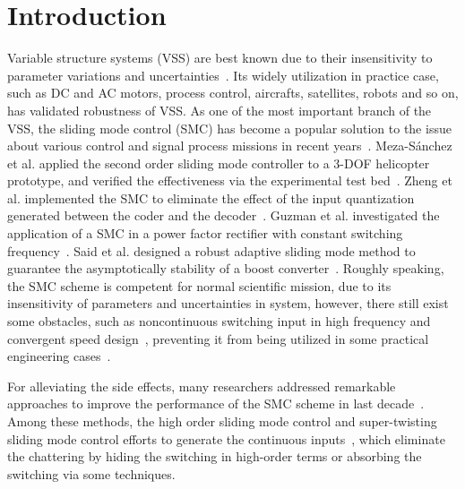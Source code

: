 \documentclass[3p]{elsarticle}
\theoremstyle{plain}
\theoremstyle{remark}
\begin{document}
\section{Introduction}
Variable structure systems (VSS) are best known due to their insensitivity to parameter variations and uncertainties~\cite{slotine1991applied}. Its widely utilization in practice case, such as DC and AC motors, process control, aircrafts, satellites, robots and so on, has validated robustness of VSS. As one of the most important branch of the VSS, the sliding mode control (SMC) has become a popular solution to the issue about various control and signal process missions in recent years~\cite{zhao2015nonlinear,zhang2015attitude}. Meza-S{\'a}nchez et al. applied the second order sliding mode controller to a 3-DOF helicopter prototype, and verified the effectiveness via the experimental test bed~\cite{meza2015output}. Zheng et al. implemented the SMC to eliminate the effect of the input quantization generated between the coder and the decoder~\cite{zheng2016sliding}. Guzman et al. investigated the application of a SMC in a power factor rectifier with constant switching frequency~\cite{guzman2016sliding}. Said et al. designed a robust adaptive sliding mode method to guarantee the asymptotically stability of a boost converter~\cite{oucheriah2013pwm}. Roughly speaking, the SMC scheme is competent for normal scientific mission, due to its insensitivity of parameters and uncertainties in system, however, there still exist some obstacles, such as noncontinuous switching input in high frequency and convergent speed design~\cite{boiko2013chattering,lee2009chattering}, preventing it from being utilized in some practical engineering cases~\cite{fridman2011sliding}. \par
For alleviating the side effects, many researchers addressed remarkable approaches to improve the performance of the SMC scheme in last decade~\cite{zong2013quasi,santiesteban2013time,mu2015continuous,evangelista2013lyapunov,gonzalez2014chattering,dadras2012fractional,zhao2013output}. Among these methods, the high order sliding mode control and super-twisting sliding mode control efforts to generate the continuous inputs~\cite{castillo2015higher,palosz2015laser,edwards2016adaptive,zhao2015finite,liu2015second}, which eliminate the chattering by hiding the switching in high-order terms or absorbing the switching via some techniques. \par
\end{document}
